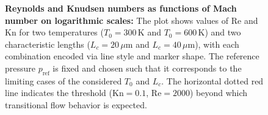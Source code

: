 \begin{figure}
\begin{tikzpicture}
\end{tikzpicture}
\caption[Reynolds and Knudsen numbers as functions of Mach number on logarithmic scales.]{
	\textbf{Reynolds and Knudsen numbers as functions of Mach number on logarithmic scales:}
	The plot shows values of $\mathrm{Re}$ and $\mathrm{Kn}$ for two temperatures ($T_0 = 300\,\mathrm{K}$ and $T_0 = 600\,\mathrm{K}$) and two characteristic lengths ($L_c = 20\,\mu\mathrm{m}$ and $L_c = 40\,\mu\mathrm{m}$), with each combination encoded via line style and marker shape.
	The reference pressure $p_\mathrm{ref}$ is fixed and chosen such that it corresponds to the limiting cases of the considered $T_0$ and $L_c$.
	The horizontal dotted red line indicates the threshold ($\mathrm{Kn} = 0.1$, $\mathrm{Re} = 2000$) beyond which transitional flow behavior is expected.
}
\label{fig:knudsen-reynolds-plot}
\end{figure}
